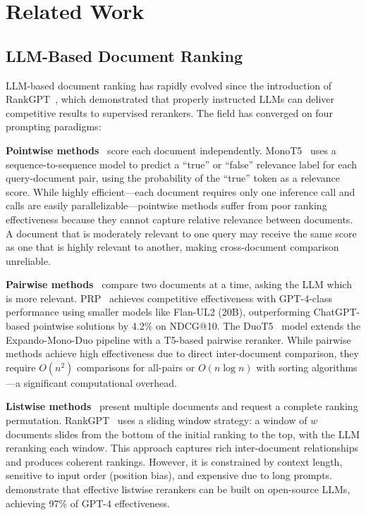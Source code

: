 \section{Related Work}
\label{sec:related}

\subsection{LLM-Based Document Ranking}

LLM-based document ranking has rapidly evolved since the introduction of RankGPT~\citep{sun2023chatgpt}, which demonstrated that properly instructed LLMs can deliver competitive results to supervised rerankers. The field has converged on four prompting paradigms:

\textbf{Pointwise methods}~\citep{nogueira2020document, sachan2022improving} score each document independently. MonoT5~\citep{nogueira2020document} uses a sequence-to-sequence model to predict a ``true'' or ``false'' relevance label for each query-document pair, using the probability of the ``true'' token as a relevance score. While highly efficient---each document requires only one inference call and calls are easily parallelizable---pointwise methods suffer from poor ranking effectiveness because they cannot capture relative relevance between documents. A document that is moderately relevant to one query may receive the same score as one that is highly relevant to another, making cross-document comparison unreliable.

\textbf{Pairwise methods}~\citep{qin2024large, pradeep2021expando} compare two documents at a time, asking the LLM which is more relevant. PRP~\citep{qin2024large} achieves competitive effectiveness with GPT-4-class performance using smaller models like Flan-UL2 (20B), outperforming ChatGPT-based pointwise solutions by 4.2\% on NDCG@10. The DuoT5~\citep{pradeep2021expando} model extends the Expando-Mono-Duo pipeline with a T5-based pairwise reranker. While pairwise methods achieve high effectiveness due to direct inter-document comparison, they require $O(n^2)$ comparisons for all-pairs or $O(n \log n)$ with sorting algorithms---a significant computational overhead.

\textbf{Listwise methods}~\citep{sun2023chatgpt, ma2023zero} present multiple documents and request a complete ranking permutation. RankGPT~\citep{sun2023chatgpt} uses a sliding window strategy: a window of $w$ documents slides from the bottom of the initial ranking to the top, with the LLM reranking each window. This approach captures rich inter-document relationships and produces coherent rankings. However, it is constrained by context length, sensitive to input order (position bias), and expensive due to long prompts. \citet{zhang2025rankwithoutgpt} demonstrate that effective listwise rerankers can be built on open-source LLMs, achieving 97\% of GPT-4 effectiveness.

